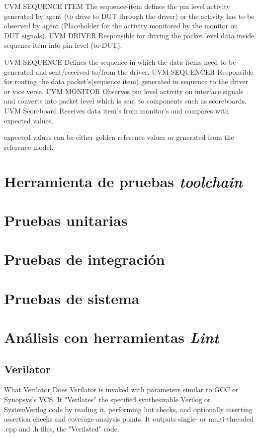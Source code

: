 \documentclass{article}
\begin{document}
UVM SEQUENCE ITEM
The sequence-item defines the pin level activity generated by agent (to drive to DUT through the driver) or the activity has to be observed by agent (Placeholder for the activity monitored by the monitor on DUT signals).
UVM DRIVER
Responsible for driving the packet level data inside sequence item into pin level (to DUT).

UVM SEQUENCE
Defines the sequence in which the data items need to be generated and sent/received to/from the driver.
UVM SEQUENCER
Responsible for routing the data packet’s(sequence item) generated in sequence to the driver or vice verse.
UVM MONITOR
Observes pin level activity on interface signals and converts into packet level which is sent to components such as scoreboards.
UVM Scoreboard
Receives data item’s from monitor’s and compares with expected values.

expected values can be either golden reference values or generated from the reference model.

\section{Herramienta de pruebas \textit{toolchain}}

\section{Pruebas unitarias}

\section{Pruebas de integración}

\section{Pruebas de sistema}

\section{Análisis con herramientas \textit{Lint}}

\subsection{Verilator}

 What Verilator Does
Verilator is invoked with parameters similar to GCC or Synopsys’s VCS. It "Verilates" the specified synthesizable Verilog or SystemVerilog code by reading it, performing lint checks, and optionally inserting assertion checks and coverage-analysis points. It outputs single- or multi-threaded .cpp and .h files, the "Verilated" code.
\end{document}
